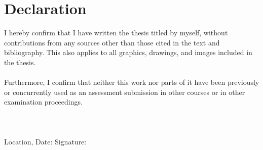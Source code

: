 \section*{Declaration}
I hereby confirm that I have written the thesis titled \printExposeTitle by myself, without contributions from any sources other than those cited in the text and bibliography. This also applies to all graphics, drawings, and images included in the thesis.
\\\\
Furthermore, I confirm that neither this work nor parts of it have been previously or concurrently used as an assessment submission in other courses or in other examination proceedings.
\\\\\\\\
Location, Date: \hrulefill  
\hspace{50pt} 
Signature: \hrulefill